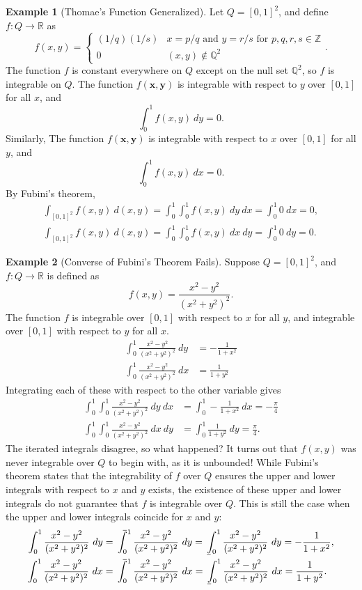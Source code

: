 \documentclass{article}
\def\upint{\mathchoice%
	{\mkern13mu\overline{\vphantom{\intop}\mkern7mu}\mkern-20mu}%
	{\mkern7mu\overline{\vphantom{\intop}\mkern7mu}\mkern-14mu}%
	{\mkern7mu\overline{\vphantom{\intop}\mkern7mu}\mkern-14mu}%
	{\mkern7mu\overline{\vphantom{\intop}\mkern7mu}\mkern-14mu}%
	\int}
\def\lowint{\mkern3mu\underline{\vphantom{\intop}\mkern7mu}\mkern-10mu\int}
\newcommand{\R}{\mathbb{R}}
\newcommand{\Q}{\mathbb{Q}}
\newcommand{\x}{\mathbf{x}}
\newcommand{\y}{\mathbf{y}}
\newcommand{\Z}{\mathbb{Z}}
\theoremstyle{definition}
\newtheorem{example}{Example}[section]
\begin{document}
\begin{example}[Thomae's Function Generalized]
Let $ Q = [0,1]^2 $, and define $ f:Q\to \R $ as 
$$f(x,y) = \begin{cases}
	(1/q)(1/s) & x = p/q \text{ and } y = r/s \text{ for }p,q,r,s\in \Z\\ 
	0 & (x,y)\notin\Q^2
\end{cases}.$$	
The function $ f $ is constant everywhere on $ Q $ except on the null set $ \Q^2 $, so $ f $ is integrable on $ Q $. The function $ f(\x,\y) $ is integrable with respect to $ y $ over $ [0,1] $ for all $ x $, and $$ \int_{0}^{1}f(x,y)\ dy = 0.$$ Similarly, The function $ f(\x,\y) $ is integrable with respect to $ x $ over $ [0,1] $ for all $ y $, and  $$ \int_{0}^{1}f(x,y)\ dx = 0.$$ By Fubini's theorem, 
\begin{align*}
	\int_{[0,1]^2} f(x,y)\ d(x, y) = \int_{0}^{1}\int_{0}^{1} f(x,y) \ dy \ dx = \int_{0}^{1}0 \ dx = 0,\\
	\int_{[0,1]^2} f(x,y)\ d(x, y) = \int_{0}^{1}\int_{0}^{1} f(x,y) \ dx \ dy = \int_{0}^{1}0 \ dy = 0.
\end{align*}
\end{example}
\begin{example}[Converse of Fubini's Theorem Fails]
	Suppose $ Q = [0,1]^2 $, and $ f:Q\to\R $ is defined as 
	$$ f(x,y)=\frac{x^2 - y^2}{(x^2+y^2)^2}.$$
	The function $ f $ is integrable over $ [0,1] $ with respect to $ x $ for all $ y $, and integrable over $ [0,1] $ with respect to $ y $ for all $ x $.
	\begin{align*}
		\int_0^1 \frac{x^2 - y^2}{(x^2+y^2)^2}\ dy &= -\frac{1}{1+x^2}\\
		\int_0^1 \frac{x^2 - y^2}{(x^2+y^2)^2}\ dx &= \frac{1}{1+y^2}
	\end{align*}
	Integrating each of these with respect to the other variable gives 
	\begin{align*}
				\int_0^1 \int_0^1 \frac{x^2 - y^2}{(x^2+y^2)^2}\ dy\ dx &= 	\int_0^1 -\frac{1}{1+x^2}\ dx = -\frac{\pi}{4}\\ 
				\int_0^1\int_0^1 \frac{x^2 - y^2}{(x^2+y^2)^2}\ dx\ dy &= \int_0^1\frac{1}{1+y^2}\ dy = \frac{\pi}{4}.
	\end{align*}
	The iterated integrals disagree, so what happened? It turns out that $ f(x,y) $ was never integrable over $ Q $ to begin with, as it is unbounded! While Fubini's theorem states that the integrability of $ f $ over $ Q $ ensures the upper and lower integrals with respect to $ x $ and $ y $ exists, the existence of these upper and lower integrals do not guarantee that $ f $ is integrable over $ Q $. This is still the case when the upper and lower integrals coincide for $ x $ and $ y $: 
	\begin{align*}
		\int_0^1 \frac{x^2 - y^2}{(x^2+y^2)^2}\ dy &  =  \upint_0^1 \frac{x^2 - y^2}{(x^2+y^2)^2}\ dy  = \lowint_0^1 \frac{x^2 - y^2}{(x^2+y^2)^2}\ dy = -\frac{1}{1+x^2},\\ 
			\int_0^1 \frac{x^2 - y^2}{(x^2+y^2)^2}\ dx & =	\upint_0^1 \frac{x^2 - y^2}{(x^2+y^2)^2}\ dx = 	\lowint_0^1 \frac{x^2 - y^2}{(x^2+y^2)^2}\ dx = \frac{1}{1+y^2}.
	\end{align*}
\end{example}
\end{document}

